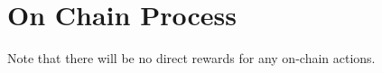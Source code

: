 \section{On Chain Process}
\label{sec:on-chain}

Note that there will be no direct rewards for any on-chain actions.
